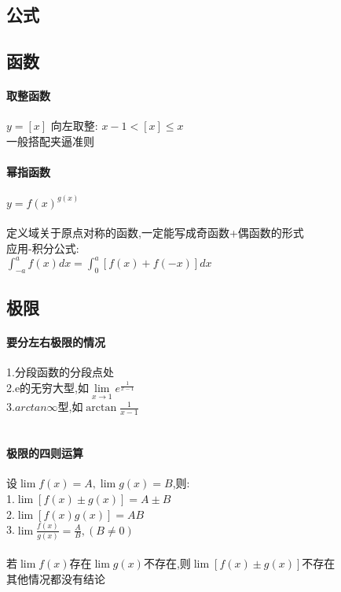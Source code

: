 \documentclass{article}
\begin{document}
\begin{flushleft}
	\huge
	
	\section{公式}
	\subsection{函数}
	
	\paragraph{取整函数}
	$y=[x]$ 向左取整: $x-1<[x]\leq x$\\
	一般搭配夹逼准则\\
	\paragraph{幂指函数}
	$y=f(x)^{g(x)}$\\
	~\\
	定义域关于原点对称的函数,一定能写成奇函数+偶函数的形式\\
	应用-积分公式:\\
	$\int_{-a}^a f(x)dx=\int_0^a [f(x)+f(-x)]dx$\\
	
	\subsection{极限}
	
	\paragraph{要分左右极限的情况}
	1.分段函数的分段点处\\
	2.e的无穷大型,如$\lim\limits_{x\to 1} e^{\frac{1}{x-1}}$\\
	3.$arctan\infty$型,如$\arctan{\frac{1}{x-1}}$\\
	~\\
	\paragraph{极限的四则运算}
	设$\lim f(x)=A,\lim g(x)=B$,则:\\
	1.$\lim [f(x)\pm g(x)]=A\pm B$\\
	2.$\lim [f(x)g(x)]=AB$\\
	3.$\lim \frac{f(x)}{g(x)} =\frac{A}{B},(B\neq 0)$\\
	~\\
	若$\lim f(x)$存在$\lim g(x)$不存在,则$\lim [f(x)\pm g(x)]$不存在\\
	其他情况都没有结论\\
	~\\

\end{flushleft}
\end{document}
